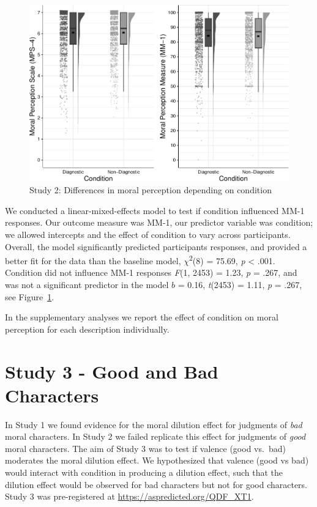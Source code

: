 \documentclass[
  man,floatsintext]{apa7}
\begin{document}
\begin{figure}
\centering
\includegraphics{moral_dilution_in_chunks_files/figure-latex/S2bothconditionplot-1.pdf}
\caption{\label{fig:S2bothconditionplot}Study 2: Differences in moral perception depending on condition}
\end{figure}

We conducted a linear-mixed-effects model to test if condition influenced MM-1 responses. Our outcome measure was MM-1, our predictor variable was condition; we allowed intercepts and the effect of condition to vary across participants. Overall, the model significantly predicted participants responses, and provided a better fit for the data than the baseline model, \(\chi\)\textsuperscript{2}(8) = 75.69, \emph{p} \textless{} .001. Condition did not influence MM-1 responses \emph{F}(1, 2453) = 1.23, \emph{p} = .267, and was not a significant predictor in the model \(b\) = 0.16, \emph{t}(2453) = 1.11, \emph{p} = .267, see Figure~\ref{fig:S2bothconditionplot}.

In the supplementary analyses we report the effect of condition on moral perception for each description individually.

\section{Study 3 - Good and Bad Characters}\label{study-3---good-and-bad-characters}

In Study 1 we found evidence for the moral dilution effect for judgments of \emph{bad} moral characters. In Study 2 we failed replicate this effect for judgments of \emph{good} moral characters. The aim of Study 3 was to test if valence (good vs.~bad) moderates the moral dilution effect. We hypothesized that valence (good vs bad) would interact with condition in producing a dilution effect, such that the dilution effect would be observed for bad characters but not for good characters. Study 3 was pre-registered at \color{blue}\url{https://aspredicted.org/QDF_XT1}\color{black}.
\end{document}
